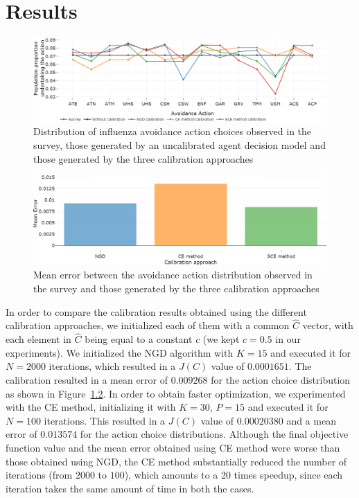 \documentclass[doublespace,draft]{VTthesis}
\begin{document}
	\chapter{Results} \label{ch:results}
	\begin{figure}
    \centering
    \includegraphics[width=\textwidth]{figures/marginals.png}
    \caption{Distribution of influenza avoidance action choices observed in the survey, those generated by an uncalibrated agent decision model and those generated by the three calibration approaches}
    \label{fig:marginals}
    \end{figure}
    
    \begin{figure}
    \centering
    \includegraphics[width=\textwidth]{figures/meanerrors.png}
    \caption{Mean error between the avoidance action distribution observed in the survey and those generated by the three calibration approaches}
    \label{fig:mean-errors}
    \vspace{-0.1in}
    \end{figure}
    
    In order to compare the calibration results obtained using the different calibration approaches, we initialized each of them with a common $\hat{C}$ vector, with each element in $\hat{C}$ being equal to a constant $c$ (we kept $c=0.5$ in our experiments). We initialized the NGD algorithm with $K=15$ and executed it for $N=2000$ iterations, which resulted in a $J(C)$ value of $0.0001651$. The calibration resulted in a mean error of $0.009268$ for the action choice distribution as shown in Figure~\ref{fig:mean-errors}. In order to obtain faster optimization, we experimented with the CE method, initializing it with $K=30$, $P=15$ and executed it for $N=100$ iterations. This resulted in a $J(C)$ value of $0.00020380$ and a mean error of $0.013574$ for the action choice distributions. Although the final objective function value and the mean error obtained using CE method were worse than those obtained using NGD, the CE method substantially reduced the number of iterations (from $2000$ to $100$), which amounts to a 20 times speedup, since each iteration takes the same amount of time in both the cases. 
    
\end{document}
